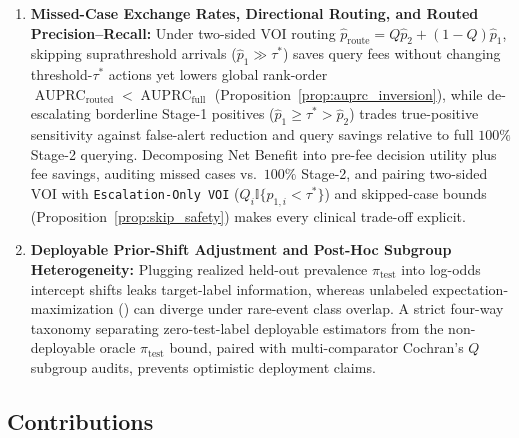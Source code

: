 \documentclass[11pt]{article}
\theoremstyle{remark}
\begin{document}
\begin{enumerate}
  \item \textbf{Missed-Case Exchange Rates, Directional Routing, and Routed Precision--Recall:} Under two-sided VOI routing $\hat{p}_{\text{route}} = Q\hat{p}_2 + (1-Q)\hat{p}_1$, skipping suprathreshold arrivals ($\hat{p}_1 \gg \tau^*$) saves query fees without changing threshold-$\tau^*$ actions yet lowers global rank-order $\operatorname{AUPRC}_{\text{routed}} < \operatorname{AUPRC}_{\text{full}}$ (Proposition~\ref{prop:auprc_inversion}), while de-escalating borderline Stage-1 positives ($\hat{p}_1 \ge \tau^* > \hat{p}_2$) trades true-positive sensitivity against false-alert reduction and query savings relative to full $100\%$ Stage-2 querying. Decomposing Net Benefit into pre-fee decision utility plus fee savings, auditing missed cases vs.\ $100\%$ Stage-2, and pairing two-sided VOI with \texttt{Escalation-Only VOI} ($Q_i\mathbb{I}\{\hat{p}_{1,i} < \tau^*\}$) and skipped-case bounds (Proposition~\ref{prop:skip_safety}) makes every clinical trade-off explicit.
  \item \textbf{Deployable Prior-Shift Adjustment and Post-Hoc Subgroup Heterogeneity:} Plugging realized held-out prevalence $\pi_{\text{test}}$ into log-odds intercept shifts leaks target-label information, whereas unlabeled expectation-maximization (\citealp{saerens2002adjusting}) can diverge under rare-event class overlap. A strict four-way taxonomy separating zero-test-label deployable estimators from the non-deployable oracle $\pi_{\text{test}}$ bound, paired with multi-comparator Cochran's $Q$ subgroup audits, prevents optimistic deployment claims.
\end{enumerate}

\subsection{Contributions}
\end{document}
